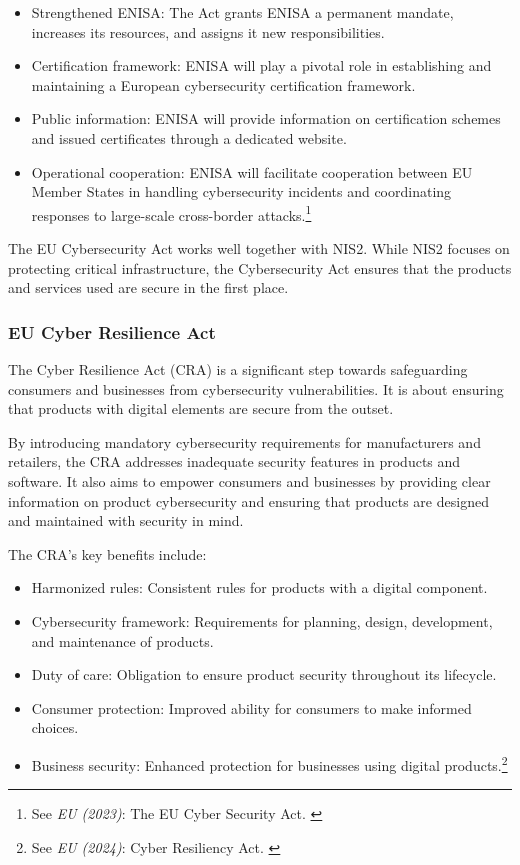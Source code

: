 \begin{itemize}
    \item Strengthened ENISA: The Act grants ENISA a permanent mandate, increases its resources, and assigns it new responsibilities.
    \item Certification framework: ENISA will play a pivotal role in establishing and maintaining a European cybersecurity certification framework.
    \item Public information: ENISA will provide information on certification schemes and issued certificates through a dedicated website.
    \item Operational cooperation: ENISA will facilitate cooperation between EU Member States in handling cybersecurity incidents and coordinating responses to large-scale cross-border attacks.\footnote{See \textit{EU (2023)}: The EU Cyber Security Act. \cite{cyberSec}}
\end{itemize}

The EU Cybersecurity Act works well together with NIS2. While NIS2 focuses on protecting critical infrastructure, the Cybersecurity Act ensures that the products and services used are secure in the first place.

\subsubsection{EU Cyber Resilience Act}

The Cyber Resilience Act (CRA) is a significant step towards safeguarding consumers and businesses from cybersecurity vulnerabilities. It is about ensuring that products with digital elements are secure from the outset. 

By introducing mandatory cybersecurity requirements for manufacturers and retailers, the CRA addresses inadequate security features in products and software. It also aims to empower consumers and businesses by providing clear information on product cybersecurity and ensuring that products are designed and maintained with security in mind. 

The CRA's key benefits include:

\begin{itemize}
    \item Harmonized rules: Consistent rules for products with a digital component.
    \item Cybersecurity framework: Requirements for planning, design, development, and maintenance of products.
    \item Duty of care: Obligation to ensure product security throughout its lifecycle.
    \item Consumer protection: Improved ability for consumers to make informed choices.
    \item Business security: Enhanced protection for businesses using digital products.\footnote{See \textit{EU (2024)}: Cyber Resiliency Act. \cite{cyberResiliency}}
\end{itemize}


